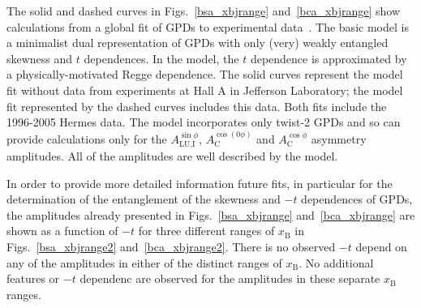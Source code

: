 The solid and dashed curves in Figs.~\ref{bsa_xbjrange} and~\ref{bca_xbjrange} show calculations from a global fit of GPDs to experimental data~\cite{Kum09}. The basic model is a minimalist dual representation of GPDs with only (very) weakly entangled skewness and $t$ dependences. In the model, the $t$ dependence is approximated by a physically-motivated Regge dependence. The solid curves represent the model fit without data from experiments \cite{Cam06, Gir08} at Hall A in Jefferson Laboratory; the model fit represented by the dashed curves includes this data. Both fits include the 1996-2005 H{\sc ermes} data. The model incorporates only twist-2 GPDs and so can provide calculations only for the $A_{\textrm{LU,I}}^{\sin\phi}$, $A_{\textrm{C}}^{\cos(0\phi)}$ and $A_{\textrm{C}}^{\cos\phi}$ asymmetry amplitudes. All of the amplitudes are well described by the model.


In order to provide more detailed information  future fits, in particular for the determination of the entanglement of the skewness and $-t$ dependences of GPDs, the amplitudes already presented in Figs.~\ref{bsa_xbjrange} and~\ref{bca_xbjrange} are shown as a function of $-t$ for three different ranges of $x_{\textrm{B}}$ in Figs.~\ref{bsa_xbjrange2} and~\ref{bca_xbjrange2}. There is no observed $-t$ depend on any of the  amplitudes in either of the distinct ranges of $x_{\textrm{B}}$. No additional features or $-t$ dependenc are observed for the  amplitudes in these separate $x_{\textrm{B}}$ ranges.
